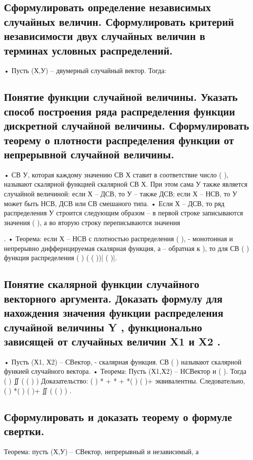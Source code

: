 \subsection{Сформулировать определение независимых случайных величин. Сформулировать критерий независимости двух случайных величин в терминах условных распределений.}

• Пусть (Х,У) – двумерный случайный вектор. Тогда:


\subsection{Понятие функции случайной величины. Указать способ построения ряда распределения функции дискретной случайной величины. Сформулировать теорему о плотности распределения функции от непрерывной случайной величины.}

• СВ У, которая каждому значению СВ Х ставит в соответствие число ( ), называют скалярной функцией скалярной СВ Х. При этом
сама У также является случайной величиной: если Х – ДСВ, то У – также ДСВ; если Х – НСВ, то У может быть НСВ, ДСВ или СВ смешаного
типа.
• Если Х – ДСВ, то ряд распределения У строится следующим образом – в первой строке записываются значения (
), а во вторую
строку переписываются значения

.
• Теорема: если Х – НСВ с плотностью распределения
( ), - монотонная и непрерывно диффернцируемая скалярная функция, а
– обратная к ), то для СВ ( ) функция распределения
( ) ( ( ))|
( )|.

\subsection{Понятие скалярной функции случайного векторного аргумента. Доказать формулу для нахождения значения функции распределения случайной величины Y , функционально зависящей от случайных величин X1 и X2 .}

• Пусть (Х1, Х2) – СВектор, - скалярная функция. СВ (
) называют скалярной функией случайного вектора.
• Теорема: Пусть (Х1,Х2) – НСВектор и ( ). Тогда
( ) ∬ ( ( )
)
Доказательство:
( ) * + * + *(
) ( )+ эквивалентны. Следовательно,
( ) *(
) ( )+
∬ ( ( )
) .

\subsection{Сформулировать и доказать теорему о формуле свертки.}

Теорема: пусть (Х,У) – СВектор, непрерывный и независимый, а




